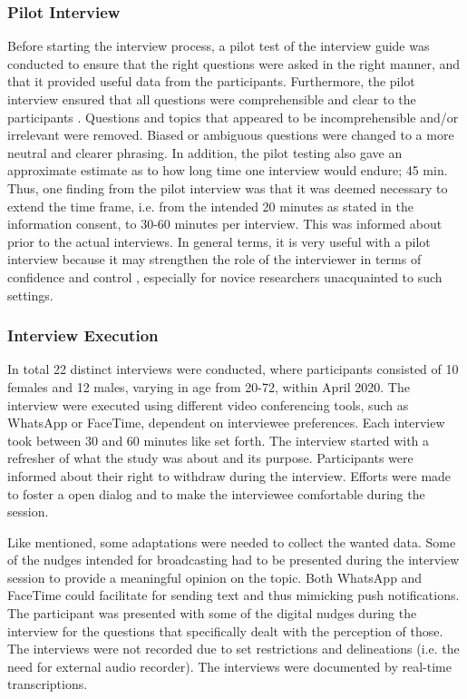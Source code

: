         \subsubsection{Pilot Interview}
        Before starting the interview process, a pilot test of the interview guide was conducted to ensure that the right questions were asked in the right manner, and that it provided useful data from the participants. Furthermore, the pilot interview ensured that all questions were comprehensible and clear to the  participants \cite{lazar_research_2017}. Questions and topics that appeared to be incomprehensible and/or irrelevant were removed. Biased or ambiguous questions were changed to a more neutral and clearer phrasing. In addition, the pilot testing also gave an approximate estimate as to how long time one interview would endure; 45 min. Thus, one finding from the pilot interview was that it was deemed necessary to extend the time frame, i.e. from the intended 20 minutes as stated in the information consent, to 30-60 minutes per interview. This was informed about prior to the actual interviews. In general terms, it is very useful with a pilot interview because it may strengthen the role of the interviewer in terms of confidence and control \cite{lazar_research_2017}, especially for novice researchers unacquainted to such settings. 
        
        \subsubsection{Interview Execution}
        In total 22 distinct interviews were conducted, where participants consisted of 10 females and 12 males, varying in age from 20-72, within April 2020. The interview were executed using different video conferencing tools, such as WhatsApp or FaceTime, dependent on interviewee preferences. Each interview took between 30 and 60 minutes like set forth. The interview started with a refresher of what the study was about and its purpose. Participants were informed about their right to withdraw during the interview. Efforts were made to foster a open dialog and to make the interviewee comfortable during the session. 
 
        Like mentioned, some adaptations were needed to collect the wanted data. Some of the nudges intended for broadcasting had to be presented during the interview session to provide a meaningful opinion on the topic. Both WhatsApp and FaceTime could facilitate for sending text and thus mimicking push notifications. The participant was presented with some of the digital nudges during the interview for the questions that specifically dealt with the perception of those. The interviews were not recorded due to set restrictions and delineations (i.e. the need for external audio recorder). The interviews were documented by real-time transcriptions. 
        
